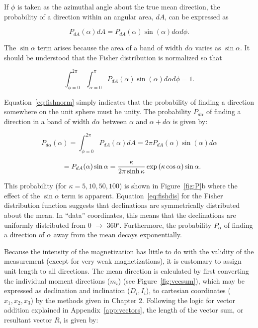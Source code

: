 If $\phi$ is taken as the azimuthal angle about the true mean direction, the probability of a direction within an
angular area, $dA$, can be expressed as

$$
P_{dA}(\alpha) dA= P_{dA}(\alpha)\sin (\alpha) d\alpha d\phi.
$$

\noindent The $\sin \alpha$ term arises because the area of a band of width $d\alpha$ varies as $\sin \alpha$.  It should be understood that the 
Fisher distribution is normalized so that 

\begin{equation}
\int_{\phi=0}^{2\pi} \int_{\alpha=0}^{\pi}  P_{dA} (\alpha) \sin (\alpha) d\alpha d\phi = 1.
\label{eq:fishnorm}
\end{equation}

\noindent Equation~\ref{eq:fishnorm} simply indicates that the probability of finding a direction somewhere on the unit sphere must be unity.  The probability $P_{d\alpha}$ of finding a direction in a band of width $d\alpha$ between $\alpha$ and $\alpha+d\alpha$ is given by:

$$
P_{d\alpha} (\alpha) = \int_{\phi=0}^{2\pi} P_{dA} (\alpha)dA = 2\pi P_{dA} (\alpha) \sin (\alpha) d\alpha
$$
 
\begin{equation}
\hskip 1em = {P_{dA}(\alpha)}  \sin \alpha = {\kappa \over 2\pi \sinh \kappa} \exp (\kappa \cos \alpha) \sin
\alpha.
\label{eq:fishpde}
\end{equation}

\noindent This probability (for $\kappa = 5, 10, 50, 100$) is shown in Figure~\ref{fig:P}b where the effect of the $\sin \alpha$ term is apparent.  
Equation~\ref{eq:fishdis} for the 
Fisher distribution function
suggests that declinations are symmetrically  distributed about the mean.  In
``data'' coordinates, this means that the declinations are uniformly distributed from 0
$\rightarrow$ 360$^{\circ}$.  Furthermore, the probability $P_{\alpha}$ of finding a
direction of $\alpha$ away from the mean decays exponentially.



Because the intensity of the magnetization has little to do with the
validity of the measurement (except for very weak magnetizations), it
is customary to assign
unit length to all directions.
%
  The mean direction is calculated by first
converting the individual moment directions ($m_i$) (see Figure~\ref{fig:vecsum}), which may be  expressed as declination and inclination ($D_i,I_i$),  
 to cartesian coordinates ($x_1,x_2,x_3$) by the methods given in Chapter 2.  Following the logic for vector addition explained in Appendix~\ref{app:vectors}, the length of the  vector sum, or 
%
resultant vector  $R$, is given by:

